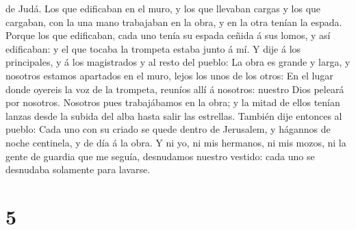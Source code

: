 de Judá.  Los que edificaban en el muro, y los que llevaban
cargas y los que cargaban, con la una mano trabajaban en la obra, y en
la otra tenían la espada.  Porque los que edificaban, cada
uno tenía su espada ceñida á sus lomos, y así edificaban: y el que
tocaba la trompeta estaba junto á mí.  Y dije á los
principales, y á los magistrados y al resto del pueblo: La obra es
grande y larga, y nosotros estamos apartados en el muro, lejos los unos
de los otros:  En el lugar donde oyereis la voz de la
trompeta, reuníos allí á nosotros: nuestro Dios peleará por nosotros.
 Nosotros pues trabajábamos en la obra; y la mitad de ellos
tenían lanzas desde la subida del alba hasta salir las estrellas.
 También dije entonces al pueblo: Cada uno con su criado se
quede dentro de Jerusalem, y hágannos de noche centinela, y de día á la
obra.  Y ni yo, ni mis hermanos, ni mis mozos, ni la gente
de guardia que me seguía, desnudamos nuestro vestido: cada uno se
desnudaba solamente para lavarse.

\hypertarget{section-4}{%
\section{5}\label{section-4}}

